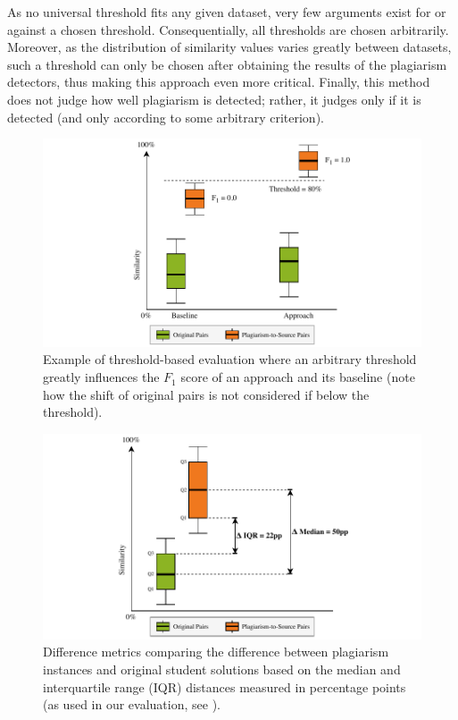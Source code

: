 As no universal threshold fits any given dataset, very few arguments exist for or against a chosen threshold. Consequentially, all thresholds are chosen arbitrarily. Moreover, as the distribution of similarity values varies greatly between datasets, such a threshold can only be chosen after obtaining the results of the plagiarism detectors, thus making this approach even more critical.
Finally, this method does not judge how well plagiarism is detected; rather, it judges only if it is detected (and only according to some arbitrary criterion).

\begin{figure}
    \centering
    \includegraphics[width=0.95\linewidth]{figures/methodology/Metrics-Thresh.pdf}
    \caption[Problematic Use of Threshold-based Metrics]{Example of threshold-based evaluation where an arbitrary threshold greatly influences the $F_1$ score of an approach and its baseline (note how the shift of original pairs is not considered if below the threshold).}
    \label{fig:diff-threshold-abuse}
\end{figure}

\begin{figure}
    \centering
    \includegraphics[width=0.95\linewidth]{figures/methodology/DiffMetrics.pdf}
    \caption[Difference Metrics in Plagiarism Evaluations]{Difference metrics comparing the difference between plagiarism instances and original student solutions based on the median and interquartile range (IQR) distances measured in percentage points (as used in our evaluation, see \gqm).}
    \label{fig:diff-metrics}
\end{figure}

